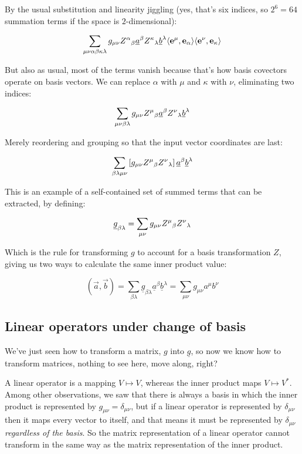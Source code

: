 By the usual substitution and linearity jiggling (yes, that's six indices, so $2^6 = 64$ summation terms if the space is $2$-dimensional):

$$
\sum_{\mu\nu\alpha\beta\kappa\lambda} g_{\mu\nu} Z\indices{^\alpha_\beta} \underline{a}^{\beta} Z\indices{^\kappa_\lambda} \underline{b}^{\lambda} \langle \vec{e}^\mu, \vec{e}_\alpha \rangle \langle \vec{e}^\nu, \vec{e}_\kappa \rangle
$$

But also as usual, most of the terms vanish because that's how basis covectors operate on basis vectors. We can replace $\alpha$ with $\mu$ and $\kappa$ with $\nu$, eliminating two indices:

$$
\sum_{\mu\nu\beta\lambda} g_{\mu\nu} Z\indices{^\mu_\beta} \underline{a}^{\beta} Z\indices{^\nu_\lambda} \underline{b}^{\lambda}
$$

Merely reordering and grouping so that the input vector coordinates are last:

$$
\sum_{\beta\lambda\mu\nu} \left[g_{\mu\nu} Z\indices{^\mu_\beta} Z\indices{^\nu_\lambda} \right] \underline{a}^{\beta} \underline{b}^{\lambda} 
$$

This is an example of a self-contained set of summed terms that can be extracted, by defining:

$$
\underline{g}_{\beta\lambda} = 
\sum_{\mu\nu} g_{\mu\nu} Z\indices{^\mu_\beta} Z\indices{^\nu_\lambda}
$$

Which is the rule for transforming $g$ to account for a basis transformation $Z$, giving us two ways to calculate the same inner product value:

$$
(\vec{a}, \vec{b})
= 
\sum_{\beta\lambda} \underline{g}_{\beta\lambda} \underline{a}^{\beta} \underline{b}^{\lambda}
= 
\sum_{\mu\nu} g_{\mu\nu} a^{\mu} b^{\nu}
$$

\subsection{Linear operators under change of basis}

We've just seen how to transform a matrix, $g$ into $\underline{g}$, so now we know how to transform matrices, nothing to see here, move along, right?

A linear operator is a mapping $V \mapsto V$, whereas the inner product maps $V \mapsto V^*$. Among other observations, we saw that there is always a basis in which the inner product is represented by $g_{\mu\nu} = \delta_{\mu\nu}$, but if a linear operator is represented by $\delta_{\mu\nu}$ then it maps every vector to itself, and that means it must be represented by $\delta_{\mu\nu}$ \textit{regardless of the basis}. So the matrix representation of a linear operator cannot transform in the same way as the matrix representation of the inner product.



